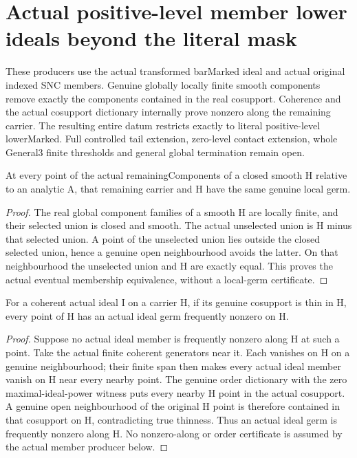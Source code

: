 \section{Actual positive-level member lower ideals beyond the literal mask}

These producers use the actual transformed barMarked ideal and actual original
indexed SNC members. Genuine globally locally finite smooth components remove
exactly the components contained in the real cosupport. Coherence and the actual
cosupport dictionary internally prove nonzero along the remaining carrier.
The resulting entire datum restricts exactly to literal positive-level
lowerMarked. Full controlled tail extension, zero-level contact extension,
whole General3 finite thresholds and general global termination remain open.

\begin{lemma}
\label{hir:member-lower-extension-actual-remaining-germ}
\leanok
At every point of the actual remainingComponents of a closed smooth H relative
to an analytic A, that remaining carrier and H have the same genuine local germ.
\end{lemma}
\begin{proof}
The real global component families of a smooth H are locally finite, and their
selected union is closed and smooth. The actual unselected union is H minus
that selected union. A point of the unselected union lies outside the closed
selected union, hence a genuine open neighbourhood avoids the latter. On that
neighbourhood the unselected union and H are exactly equal. This proves the
actual eventual membership equivalence, without a local-germ certificate.
\end{proof}

\begin{lemma}
\label{hir:member-lower-extension-nonzero-from-thin}
\leanok
For a coherent actual ideal I on a carrier H, if its genuine cosupport is thin
in H, every point of H has an actual ideal germ frequently nonzero on H.
\end{lemma}
\begin{proof}
Suppose no actual ideal member is frequently nonzero along H at such a point.
Take the actual finite coherent generators near it. Each vanishes on H on a
genuine neighbourhood; their finite span then makes every actual ideal member
vanish on H near every nearby point. The genuine order dictionary with the
zero maximal-ideal-power witness puts every nearby H point in the actual
cosupport. A genuine open neighbourhood of the original H point is therefore
contained in that cosupport on H, contradicting true thinness. Thus an actual
ideal germ is frequently nonzero along H. No nonzero-along or order certificate
is assumed by the actual member producer below.
\end{proof}

